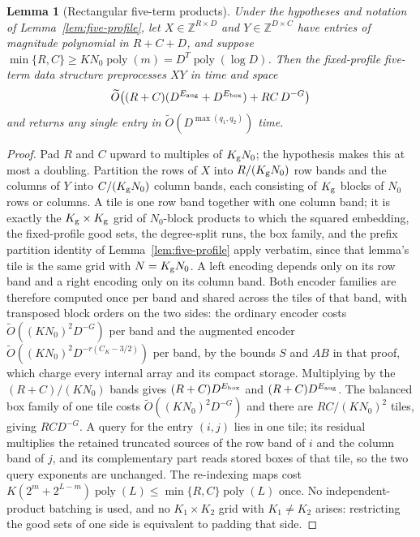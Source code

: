 \documentclass[11pt]{article}
\newtheorem{lemma}[theorem]{Lemma}
\newcommand{\softO}{\widetilde O}
\begin{document}
\begin{lemma}[Rectangular five-term products]
\label{lem:five-rect-tiles}
Under the hypotheses and notation of Lemma~\ref{lem:five-profile}, let
$X\in\mathbb Z^{R\times D}$ and $Y\in\mathbb Z^{D\times C}$ have entries of
magnitude polynomial in $R+C+D$, and suppose
$\min\{R,C\}\ge KN_0\operatorname{poly}(m)=D^T\operatorname{poly}(\log D)$.
Then the fixed-profile five-term data structure preprocesses $XY$ in time
and space
\[
\softO\bigl((R+C)(D^{E_{\rm aug}}+D^{E_{\rm box}})+RC\,D^{-G}\bigr)
\]
and returns any single entry in $\softO(D^{\max(q_1,q_2)})$ time.
\end{lemma}
\begin{proof}
Pad $R$ and $C$ upward to multiples of $K_{\rm g}N_0$; the hypothesis makes
this at most a doubling. Partition the rows of $X$ into $R/(K_{\rm g}N_0)$
row bands and the columns of $Y$ into $C/(K_{\rm g}N_0)$ column bands, each
consisting of $K_{\rm g}$ blocks of $N_0$ rows or columns. A tile is one row
band together with one column band; it is exactly the
$K_{\rm g}\times K_{\rm g}$ grid of $N_0$-block products to which the squared
embedding, the fixed-profile good sets, the degree-split runs, the box
family, and the prefix partition identity of Lemma~\ref{lem:five-profile}
apply verbatim, since that lemma's tile is the same grid with
$N=K_{\rm g}N_0$. A left encoding depends only on its row band and a right
encoding only on its column band. Both encoder families are therefore
computed once per band and shared across the tiles of that band, with
transposed block orders on the two sides: the ordinary encoder costs
$\softO((KN_0)^2D^{-G})$ per band and the augmented encoder
$\softO((KN_0)^2D^{-r(C_K-3/2)})$ per band, by the bounds $S$ and $AB$ in
that proof, which charge every internal array and its compact storage.
Multiplying by the $(R+C)/(KN_0)$ bands gives $(R+C)D^{E_{\rm box}}$ and
$(R+C)D^{E_{\rm aug}}$. The balanced box family of one tile costs
$\softO((KN_0)^2D^{-G})$ and there are $RC/(KN_0)^2$ tiles, giving
$RCD^{-G}$. A query for the entry $(i,j)$ lies in one tile; its residual
multiplies the retained truncated sources of the row band of $i$ and the
column band of $j$, and its complementary part reads stored boxes of that
tile, so the two query exponents are unchanged. The re-indexing maps cost
$K(2^m+2^{L-m})\operatorname{poly}(L)\le\min\{R,C\}\operatorname{poly}(L)$
once. No independent-product batching is used, and no $K_1\times K_2$ grid
with $K_1\ne K_2$ arises: restricting the good sets of one side is
equivalent to padding that side.
\end{proof}
\end{document}

